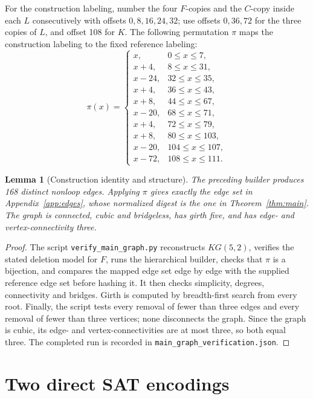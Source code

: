\documentclass[11pt]{article}
\newtheorem{lemma}[theorem]{Lemma}
\newcommand{\code}[1]{\texttt{#1}}
\begin{document}
For the construction labeling, number the four \(F\)-copies and the \(C\)-copy
inside each \(L\) consecutively with offsets \(0,8,16,24,32\); use offsets
\(0,36,72\) for the three copies of \(L\), and offset 108 for \(K\).  The
following permutation \(\pi\) maps the construction labeling to the fixed
reference labeling:
\[
\pi(x)=
\begin{cases}
x,&0\le x\le7,\\
x+4,&8\le x\le31,\\
x-24,&32\le x\le35,\\
x+4,&36\le x\le43,\\
x+8,&44\le x\le67,\\
x-20,&68\le x\le71,\\
x+4,&72\le x\le79,\\
x+8,&80\le x\le103,\\
x-20,&104\le x\le107,\\
x-72,&108\le x\le111.
\end{cases}
\]

\begin{lemma}[Construction identity and structure]\label{lem:structure}
The preceding builder produces 168 distinct nonloop edges.  Applying \(\pi\)
gives exactly the edge set in Appendix~\ref{app:edges}, whose normalized digest
is the one in Theorem~\ref{thm:main}.  The graph is connected, cubic and
bridgeless, has girth five, and has edge- and vertex-connectivity three.
\end{lemma}

\begin{proof}
The script \code{verify\_main\_graph.py} reconstructs
\(KG(5,2)\), verifies the stated deletion model for \(F\), runs
the hierarchical builder, checks that \(\pi\) is a bijection, and compares the
mapped edge set edge by edge with the supplied reference edge set before hashing
it.  It then checks simplicity, degrees, connectivity and bridges.  Girth is
computed by breadth-first search from every root.  Finally, the script tests
every removal of fewer than three edges and every removal of fewer than three
vertices; none disconnects the graph.  Since the graph is cubic, its edge- and
vertex-connectivities are at most three, so both equal three.  The completed
run is recorded in \code{main\_graph\_verification.json}.
\end{proof}

\section{Two direct SAT encodings}\label{sec:sat}
\end{document}
